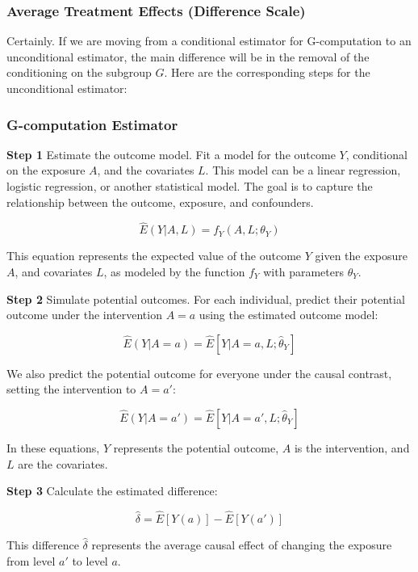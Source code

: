 \documentclass[
  singlecolumn]{article}
\begin{document}
\hypertarget{average-treatment-effects-difference-scale}{%
\subsubsection{Average Treatment Effects (Difference
Scale)}\label{average-treatment-effects-difference-scale}}

Certainly. If we are moving from a conditional estimator for
G-computation to an unconditional estimator, the main difference will be
in the removal of the conditioning on the subgroup \(G\). Here are the
corresponding steps for the unconditional estimator:

\hypertarget{g-computation-estimator}{%
\subsubsection{\texorpdfstring{\textbf{G-computation
Estimator}}{G-computation Estimator}}\label{g-computation-estimator}}

\textbf{Step 1} Estimate the outcome model. Fit a model for the outcome
\(Y\), conditional on the exposure \(A\), and the covariates \(L\). This
model can be a linear regression, logistic regression, or another
statistical model. The goal is to capture the relationship between the
outcome, exposure, and confounders.

\[ \hat{E}(Y|A,L) = f_Y(A,L; \theta_Y) \]

This equation represents the expected value of the outcome \(Y\) given
the exposure \(A\), and covariates \(L\), as modeled by the function
\(f_Y\) with parameters \(\theta_Y\).

\textbf{Step 2} Simulate potential outcomes. For each individual,
predict their potential outcome under the intervention \(A=a\) using the
estimated outcome model:

\[\hat{E}(Y|A=a)  = \hat{E}[Y|A=a,L; \hat{\theta}_Y]\]

We also predict the potential outcome for everyone under the causal
contrast, setting the intervention to \(A=a'\):

\[  \hat{E}(Y|A=a')  = \hat{E}[Y|A=a',L; \hat{\theta}_Y]\]

In these equations, \(Y\) represents the potential outcome, \(A\) is the
intervention, and \(L\) are the covariates.

\textbf{Step 3} Calculate the estimated difference:

\[\hat{\delta} = \hat{E}[Y(a)] - \hat{E}[Y(a')]\]

This difference \(\hat{\delta}\) represents the average causal effect of
changing the exposure from level \(a'\) to level \(a\).
\end{document}

